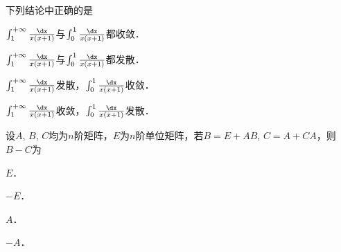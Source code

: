 \documentclass[plain,noanswer,medmath]{../../template/jnuexam}
\begin{document}
























\begin{problem}
下列结论中正确的是\pickout{}
\begin{abcd}
\item $\int_1^{+\infty} \frac{\dx}{x(x + 1)}$与$\int_0^1 \frac{\dx}{x(x + 1)}$都收敛．
\item $\int_1^{+\infty} \frac{\dx}{x(x + 1)}$与$\int_0^1 \frac{\dx}{x(x + 1)}$都发散．
\item $\int_1^{+\infty} \frac{\dx}{x(x + 1)}$发散，$\int_0^1 \frac{\dx}{x(x + 1)}$收敛．
\item $\int_1^{+\infty} \frac{\dx}{x(x + 1)}$收敛，$\int_0^1 \frac{\dx}{x(x + 1)}$发散．
\end{abcd}
\end{problem}






\begin{problem}
设$A$, $B$, $C$均为$n$阶矩阵，$E$为$n$阶单位矩阵，若$B = E + AB$, $C = A + CA$，则$B - C$为\pickout{}
\begin{abcd}
\item $E$．
\item $- E$．
\item $A$．
\item $- A$．
\end{abcd}
\end{problem}
\end{document}
